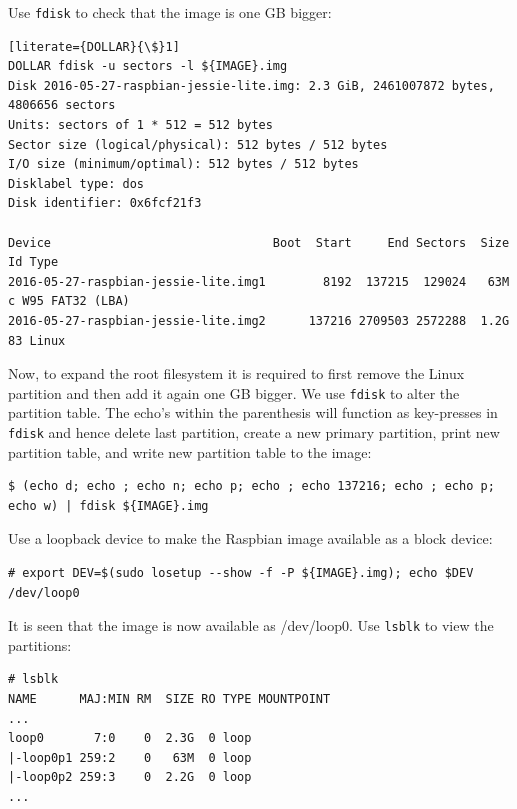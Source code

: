 Use \texttt{fdisk} to check that the image is one \ac{GB} bigger:
\begin{lstlisting}[literate={DOLLAR}{\$}1]
DOLLAR fdisk -u sectors -l ${IMAGE}.img
Disk 2016-05-27-raspbian-jessie-lite.img: 2.3 GiB, 2461007872 bytes, 4806656 sectors
Units: sectors of 1 * 512 = 512 bytes
Sector size (logical/physical): 512 bytes / 512 bytes
I/O size (minimum/optimal): 512 bytes / 512 bytes
Disklabel type: dos
Disk identifier: 0x6fcf21f3

Device                               Boot  Start     End Sectors  Size Id Type
2016-05-27-raspbian-jessie-lite.img1        8192  137215  129024   63M  c W95 FAT32 (LBA)
2016-05-27-raspbian-jessie-lite.img2      137216 2709503 2572288  1.2G 83 Linux
\end{lstlisting}
\FloatBarrier
\vspace{-5mm}

Now, to expand the root filesystem it is required to first remove the Linux partition
and then add it again one \ac{GB} bigger.
We use \texttt{fdisk} to alter the partition table. The echo's within the parenthesis
will function as
key-presses in \texttt{fdisk} and hence delete last partition, create a new
primary partition, print new partition table, and write new partition table
to the image:

\begin{lstlisting}[]
$ (echo d; echo ; echo n; echo p; echo ; echo 137216; echo ; echo p; echo w) | fdisk ${IMAGE}.img
\end{lstlisting}
\FloatBarrier
\vspace{-5mm}

Use a loopback device to make the Raspbian image available as a block device: 
\begin{lstlisting}[]
# export DEV=$(sudo losetup --show -f -P ${IMAGE}.img); echo $DEV
/dev/loop0
\end{lstlisting}
\FloatBarrier
\vspace{-5mm}

It is seen that the image is now available as /dev/loop0. Use \texttt{lsblk}
to view the partitions:

\begin{lstlisting}[]
# lsblk
NAME      MAJ:MIN RM  SIZE RO TYPE MOUNTPOINT
...
loop0       7:0    0  2.3G  0 loop 
|-loop0p1 259:2    0   63M  0 loop 
|-loop0p2 259:3    0  2.2G  0 loop
...
\end{lstlisting}
\FloatBarrier
\vspace{-5mm}

